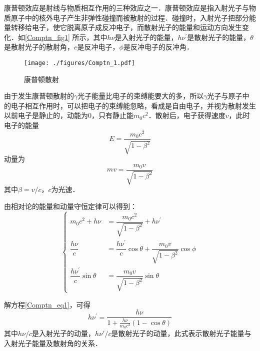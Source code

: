 
康普顿效应是射线与物质相互作用的三种效应之一．康普顿效应是指入射光子与物质原子中的核外电子产生非弹性碰撞而被散射的过程．碰撞时，入射光子把部分能量转移给电子，使它脱离原子成反冲电子，而散射光子的能量和运动方向发生变化．如\autoref{Comptn_fig1} 所示，其中$h\nu$是入射光子的能量，$h\nu^\prime$是散射光子的能量，$\theta$是散射光子的散射角，$e$是反冲电子，$\phi$是反冲电子的反冲角．
\begin{figure}[ht]
\centering
\texttt{[image: ./figures/Comptn\_1.pdf]}
\caption{康普顿散射} \label{Comptn_fig1}
\end{figure}
由于发生康普顿散射的$\gamma$光子能量比电子的束缚能要大的多，所以$\gamma$光子与原子中的电子相互作用时，可以把电子的束缚能忽略，看成是自由电子，并视为散射发生以前电子是静止的，动能为$0$，只有静止能$m_0c^2$．散射后，电子获得速度$v$，此时电子的能量
\begin{equation}
E=\frac{m_{0} c^{2}}{\sqrt{1-\beta^{2}}}
\end{equation}
动量为
\begin{equation}
m v=\frac{m_{0} v}{\sqrt{1-\beta^{2}}}
\end{equation}
其中$\beta=v/c$，$c$为光速．

由相对论的能量和动量守恒定律可以得到：
\begin{equation} \label{Comptn_eq1}
\begin{cases}
m_{0} c^{2}+h \nu&=\dfrac{m_{0} c^{2}}{\sqrt{1-\beta^{2}}}+h \nu^{\prime} \\
\dfrac{h \nu}{c}&=\dfrac{h \nu^{\prime}}{c} \cos \theta+\dfrac{m_{0} v}{\sqrt{1-\beta^{2}}} \cos \phi \\
\dfrac{h \nu^{\prime}}{c} \sin \theta&=\dfrac{m_{0} v}{\sqrt{1-\beta^{2}}} \sin \theta
\end{cases}
\end{equation}

解方程\autoref{Comptn_eq1}，可得
\begin{equation}
h \nu^{\prime}=\frac{h \nu}{1+\frac{h \nu}{m_{0} c^{2}}(1-\cos \theta)}
\end{equation}
其中$h\nu / c$是入射光子的动量，$h\nu' / c$是散射光子的动量，此式表示散射光子能量与入射光子能量及散射角的关系．